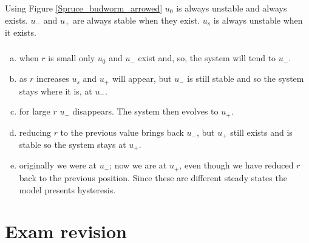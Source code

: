 \documentclass[]{article}
\newcommand{\fig}[1]{Figure \ref{#1}}
\begin{document}
\begin{Answ}
\subsubsection{}
Using \fig{Spruce_budworm_arrowed} $u_0$ is always unstable and always exists. $u_-$ and $u_+$ are always stable when they exist. $u_s$ is always unstable when it exists.
\subsubsection{}
\begin{enumerate}[(a)]
\item when $r$ is small only $u_0$ and $u_-$ exist and, so, the system will tend to $u_-$.
\item as $r$ increases $u_s$ and $u_+$ will appear, but $u_-$ is still stable and so the system stays where it is, at $u_-$.
\item for large $r$ $u_-$ disappears. The system then evolves to $u_+$.
\item reducing $r$ to the previous value brings back $u_-$, but $u_+$ still exists and is stable so the system stays at $u_+$.
\item originally we were at $u_-$; now we are at $u_+$, even though we have reduced $r$ back to the previous position. Since these are different steady states the model presents hysteresis.
\end{enumerate} 
\end{Answ}

\section*{Exam revision}
\end{document}
